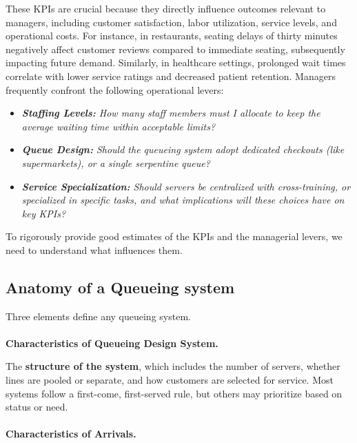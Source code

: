 \documentclass[
  letterpaper,
  DIV=11,
  numbers=noendperiod]{scrartcl}
\makeatletter
\let\oldparagraph\paragraph
\renewcommand{\paragraph}{
    \@ifstar
      \xxxParagraphStar
      \xxxParagraphNoStar
  }
\newcommand{\xxxParagraphStar}[1]{\oldparagraph*{#1}\mbox{}}
\newcommand{\xxxParagraphNoStar}[1]{\oldparagraph{#1}\mbox{}}
\makeatother
\begin{document}
These KPIs are crucial because they directly influence outcomes relevant
to managers, including customer satisfaction, labor utilization, service
levels, and operational costs. For instance, in restaurants, seating
delays of thirty minutes negatively affect customer reviews compared to
immediate seating, subsequently impacting future demand. Similarly, in
healthcare settings, prolonged wait times correlate with lower service
ratings and decreased patient retention. Managers frequently confront
the following operational levers:

\begin{itemize}
\item
  \emph{\textbf{Staffing Levels:} How many staff members must I allocate
  to keep the average waiting time within acceptable limits?}
\item
  \emph{\textbf{Queue Design:} Should the queueing system adopt
  dedicated checkouts (like supermarkets), or a single serpentine
  queue?}
\item
  \emph{\textbf{Service Specialization:} Should servers be centralized
  with cross-training, or specialized in specific tasks, and what
  implications will these choices have on key KPIs?}
\end{itemize}

To rigorously provide good estimates of the KPIs and the managerial
levers, we need to understand what influences them.

\subsection{\texorpdfstring{\textbf{Anatomy of a Queueing
system}}{Anatomy of a Queueing system}}\label{anatomy-of-a-queueing-system}

Three elements define any queueing system.

\paragraph{\texorpdfstring{\textbf{Characteristics of Queueing Design
System.}}{Characteristics of Queueing Design System.}}\label{characteristics-of-queueing-design-system.}

The \textbf{structure of the system}, which includes the number of
servers, whether lines are pooled or separate, and how customers are
selected for service. Most systems follow a first-come, first-served
rule, but others may prioritize based on status or need.

\paragraph{\texorpdfstring{\textbf{Characteristics of
Arrivals.}}{Characteristics of Arrivals.}}\label{characteristics-of-arrivals.}
\end{document}
